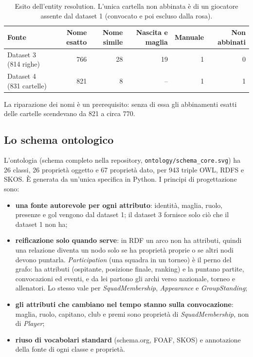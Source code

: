 \documentclass[11pt,a4paper]{article}
\newcommand{\code}[1]{\texttt{\small #1}}
\begin{document}
\begin{table}[!htb]
\centering\small
\begin{tabular}{@{}l r r r r r@{}}
\toprule
\textbf{Fonte} & \textbf{Nome esatto} & \textbf{Nome simile} & \textbf{Nascita e maglia} & \textbf{Manuale} & \textbf{Non abbinati} \\
\midrule
Dataset 3 (814 righe) & 766 & 28 & 19 & 1 & 0 \\
Dataset 4 (831 cartelle) & 821 & 8 & -- & 1 & 1 \\
\bottomrule
\end{tabular}
\caption{Esito dell'entity resolution. L'unica cartella non abbinata è di un giocatore assente dal dataset 1 (convocato e poi escluso dalla rosa).}
\label{tab:er}
\end{table}

La riparazione dei nomi è un prerequisito: senza di essa gli abbinamenti esatti delle cartelle scendevano da 821 a circa 770.

\subsection{Lo schema ontologico}
L'ontologia (schema completo nella repository, \code{ontology/schema\_core.svg}) ha 26 classi, 26 proprietà oggetto e 67 proprietà dato, per 943 triple OWL, RDFS e SKOS. È generata da un'unica specifica in Python. I principi di progettazione sono:
\begin{itemize}
  \item \textbf{una fonte autorevole per ogni attributo}: identità, maglia, ruolo, presenze e gol vengono dal dataset 1; il dataset 3 fornisce solo ciò che il dataset 1 non ha;
  \item \textbf{reificazione solo quando serve}: in RDF un arco non ha attributi, quindi una relazione diventa un nodo solo se ha proprietà proprie o se altri nodi devono puntarla. \emph{Participation} (una squadra in un torneo) è il perno del grafo: ha attributi (ospitante, posizione finale, ranking) e la puntano partite, convocazioni ed eventi, e da lei partono gli archi verso nazionale, torneo e allenatori. Lo stesso vale per \emph{SquadMembership}, \emph{Appearance} e \emph{GroupStanding};
  \item \textbf{gli attributi che cambiano nel tempo stanno sulla convocazione}: maglia, ruolo, capitano, club e premi sono proprietà di \emph{SquadMembership}, non di \emph{Player};
  \item \textbf{riuso di vocabolari standard} (schema.org, FOAF, SKOS) e annotazione della fonte di ogni classe e proprietà.
\end{itemize}
\end{document}
